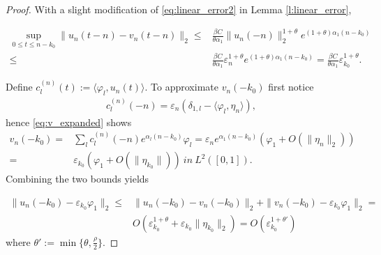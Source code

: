 \documentclass{article}
\newcommand{\1}[1]{{\mathds{1}}_{\left\{#1\right\}}}
\begin{document}
\begin{proof}
	With a slight modification of \eqref{eq:linear_error2} in Lemma \ref{l:linear_error},

	\begin{align*}
		\sup_{0 \leq t \leq n-k_0}\|u_n(t-n)-v_n(t-n) \|_2 \leq& \frac{\beta C}{\theta\alpha_1}\|u_n(-n) \|_2^{1+\theta}e^{(1+\theta) \alpha_1(n-k_0)} \\
		\leq& \frac{\beta C}{\theta\alpha_1}\varepsilon_n^{1+\theta}e^{(1+\theta) \alpha_1(n-k_0)}= \frac{\beta C}{\theta \alpha_1}\varepsilon_{k_0}^{1+\theta}.	
	\end{align*}
	

	Define $c_l^{(n)}(t):=\langle \varphi_l, u_n(t) \rangle.$ To approximate $v_n(-k_0)$ first notice
	\begin{align*}
		c_l^{(n)}(-n)=\varepsilon_n\left(\delta_{1,l}- \langle \varphi_l,\eta_n \rangle \right),
	\end{align*}
	hence \eqref{eq:v_expanded} shows
	\begin{align*}
		v_n(-k_0)=&\sum_{l}c_l^{(n)}(-n)e^{\alpha_l(n-k_0)} \varphi_l=\varepsilon_ne^{\alpha_1(n-k_0)}\left(\varphi_1+O\left(\|\eta_n \|_2 \right) \right)\\
		=&\varepsilon_{k_0}\left(\varphi_1+O\left(\|\eta_{k_0} \| \right)\right) \ \textit{in} \ L^{2}([0,1]).
	\end{align*}
	 Combining the two bounds yields
	
	\begin{align*}
		\|u_n(-k_0)-\varepsilon_{k_0}\varphi_1 \|_2 \leq& \|u_n(-k_0)-v_n(-k_0) \|_2+\|v_n(-k_0)-\varepsilon_{k_0} \varphi_1 \|_2=\\
		&O \left(\varepsilon_{k_0}^{1+\theta}+\varepsilon_{k_0}\|\eta_{k_0} \|_2 \right) =O \left( \varepsilon_{k_0}^{1+\theta'} \right)
	\end{align*}
	where $\theta':=\min \{\theta, \frac{\rho}{2} \}.$
	

\end{proof}
\end{document}
